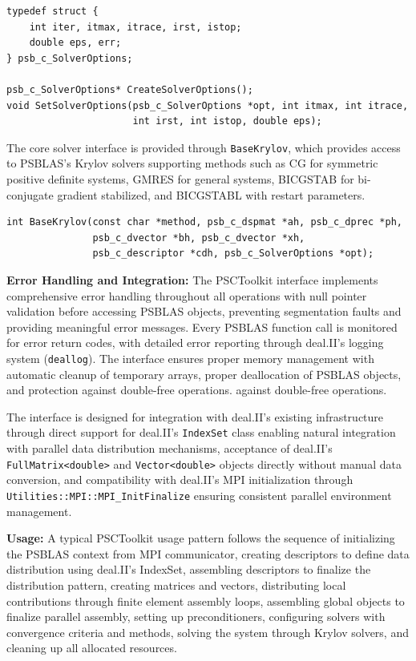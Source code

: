 \documentclass[a4paper,12pt]{article}
\begin{document}
\begin{lstlisting}[caption=Solver options structure and management]
typedef struct {
    int iter, itmax, itrace, irst, istop;
    double eps, err;
} psb_c_SolverOptions;

psb_c_SolverOptions* CreateSolverOptions();
void SetSolverOptions(psb_c_SolverOptions *opt, int itmax, int itrace,
                      int irst, int istop, double eps);
\end{lstlisting}

The core solver interface is provided through \texttt{BaseKrylov}, which provides access to
PSBLAS's Krylov solvers supporting methods such as CG for symmetric positive definite
systems, GMRES for general systems, BICGSTAB for bi-conjugate gradient stabilized,
and BICGSTABL with restart parameters.

\begin{lstlisting}[caption=Krylov solver interface]
int BaseKrylov(const char *method, psb_c_dspmat *ah, psb_c_dprec *ph,
               psb_c_dvector *bh, psb_c_dvector *xh,
               psb_c_descriptor *cdh, psb_c_SolverOptions *opt);
\end{lstlisting}

\textbf{Error Handling and Integration:} The PSCToolkit interface implements
comprehensive error handling throughout all operations with null pointer validation
before accessing PSBLAS objects, preventing segmentation faults and providing meaningful
error messages. Every PSBLAS function call is monitored for error return codes, with
detailed error reporting through deal.II's logging system (\texttt{deallog}). The
interface ensures proper memory management with automatic cleanup of temporary arrays,
proper deallocation of PSBLAS objects, and protection against double-free operations.
against double-free operations.

The interface is designed for integration with deal.II's existing
infrastructure through direct support for deal.II's \texttt{IndexSet}
class enabling natural integration with parallel data distribution mechanisms,
acceptance of deal.II's \texttt{FullMatrix<double>} and \texttt{Vector<double>}
objects directly without manual data conversion, and compatibility with deal.II's
MPI initialization through \texttt{Utilities::MPI::MPI\_InitFinalize} ensuring
consistent parallel environment management.

\textbf{Usage:} A typical PSCToolkit usage pattern follows the sequence of initializing
the PSBLAS context from MPI communicator, creating descriptors to define data
distribution using deal.II's IndexSet, assembling descriptors to finalize the
distribution pattern, creating matrices and vectors, distributing local
contributions through finite element assembly loops, assembling global
objects to finalize parallel assembly, setting up preconditioners, configuring
solvers with convergence criteria and methods, solving the system through Krylov
solvers, and cleaning up all allocated resources.
\end{document}
